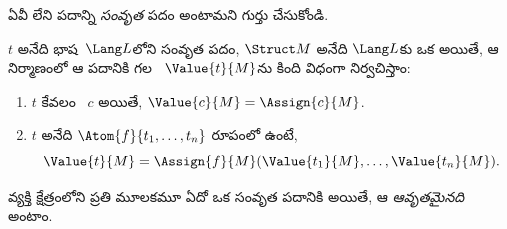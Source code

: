 \documentclass[../../../include/open-logic-section]{subfiles}
\begin{document}


\begin{explain}
 ఏవీ లేని పదాన్ని \emph{సంవృత} పదం అంటామని గుర్తు చేసుకోండి.
\end{explain}

\begin{defn}
$t$ అనేది భాష~$\Lang L$లోని సంవృత పదం, $\Struct M$ అనేది
$\Lang L$కు ఒక  అయితే, ఆ నిర్మాణంలో ఆ పదానికి గల
\emph{}~$\Value{t}{M}$ను
కింది విధంగా నిర్వచిస్తాం:
\begin{enumerate}
\item $t$ కేవలం ~$c$ అయితే, $\Value{c}{M} = \Assign{c}{M}$.
\item $t$ అనేది $\Atom{f}{t_1, \ldots, t_n}$ రూపంలో ఉంటే,
  \[
  \Value{t}{M} = \Assign{f}{M}(\Value{t_1}{M}, \ldots,
  \Value{t_n}{M}).
  \]
\end{enumerate}
\end{defn}

\begin{defn}
వ్యక్తి క్షేత్రంలోని ప్రతి మూలకమూ ఏదో ఒక సంవృత పదానికి
 అయితే, ఆ  \emph{ఆవృతమైనది} అంటాం.
\end{defn}
\end{document}
